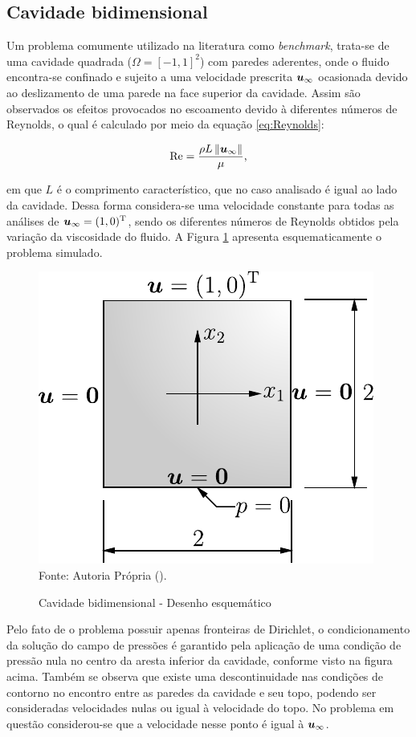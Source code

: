 \subsection{Cavidade bidimensional} \label{ex:cavity}

Um problema comumente utilizado na literatura como \textit{benchmark}, trata-se de uma cavidade quadrada ($\Omega=[-1,1]^2$) com paredes aderentes, onde o fluido encontra-se confinado e sujeito a uma velocidade prescrita $\boldsymbol{u}_\infty$ ocasionada devido ao deslizamento de uma parede na face superior da cavidade. Assim são observados os efeitos provocados no escoamento devido à diferentes números de Reynolds, o qual é calculado por meio da equação \eqref{eq:Reynolds}:

\begin{equation}
    \mathrm{Re}=\frac{\rho L\left\lVert{\boldsymbol{u}_\infty}\right\lVert}{\mu}\text{,}
    \label{eq:Reynolds}
\end{equation}

\noindent em que $L$ é o comprimento característico, que no caso analisado é igual ao lado da cavidade. Dessa forma considera-se uma velocidade constante para todas as análises de $\boldsymbol{u}_\infty=(1,0)^\mathrm{T}$, sendo os diferentes números de Reynolds obtidos pela variação da viscosidade do fluido. A Figura \ref{fig:cavity} apresenta esquematicamente o problema simulado.

\begin{figure}[h!]
    \centering
    \caption{Cavidade bidimensional - Desenho esquemático}
    \includegraphics[width=.4\linewidth]{Figuras/Cavity/cavidade.pdf}
    \\Fonte: Autoria Própria (\the\year).
    \label{fig:cavity}
\end{figure}

Pelo fato de o problema possuir apenas fronteiras de Dirichlet, o condicionamento da solução do campo de pressões é garantido pela aplicação de uma condição de pressão nula no centro da aresta inferior da cavidade, conforme visto na figura acima. Também se observa que existe uma descontinuidade nas condições de contorno no encontro entre as paredes da cavidade e seu topo, podendo ser consideradas velocidades nulas ou igual à velocidade do topo. No problema em questão considerou-se que a velocidade nesse ponto é igual à $\boldsymbol{u}_\infty$.

